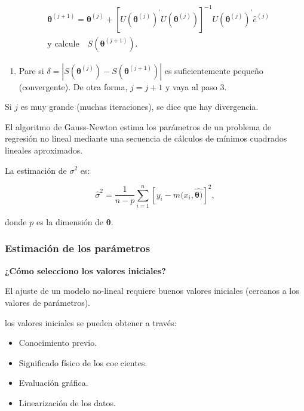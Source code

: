 \documentclass[
]{article}
\providecommand{\tightlist}{%
  \setlength{\itemsep}{0pt}\setlength{\parskip}{0pt}}
\begin{document}
\begin{equation}
\begin{split}
& \boldsymbol \theta^{(j+1)}=\boldsymbol \theta^{(j)}+[U(\boldsymbol \theta^{(j)})^{'}U(\boldsymbol \theta^{(j)})]^{-1}U(\boldsymbol \theta^{(j)})^{'} \hat{e}^{(j)} \\
& \text{y calcule} \quad S(\boldsymbol \theta^{(j+1)}).
\end{split}
\end{equation}

\begin{enumerate}
\def\labelenumi{\arabic{enumi}.}
\setcounter{enumi}{3}
\tightlist
\item
  Pare si \(\delta=|S(\boldsymbol \theta^{(j)})-S(\boldsymbol \theta^{(j+1)})|\) es suficientemente pequeño (convergente). De otra forma, \(j=j+1\) y vaya al paso 3.
\end{enumerate}

Si \(j\) es muy grande (muchas iteraciones), se dice que hay divergencia.

El algoritmo de Gauss-Newton estima los parámetros de un problema
de regresión no lineal mediante una secuencia de cálculos de mínimos cuadrados lineales aproximados.

La estimación de \(\sigma^2\) es:

\[
\hat{\sigma}^2=\frac{1}{n-p}\sum_{i=1}^n[y_{i}-m(x_{i},\hat{\boldsymbol \theta)}]^2,
\]

donde \(p\) es la dimensión de \(\boldsymbol \theta\).

\hypertarget{estimaciuxf3n-de-los-paruxe1metros-1}{%
\subsubsection{Estimación de los parámetros}\label{estimaciuxf3n-de-los-paruxe1metros-1}}

\textbf{¿Cómo selecciono los valores iniciales?}

El ajuste de un modelo no-lineal requiere buenos valores iniciales
(cercanos a los valores de parámetros).

los valores iniciales se pueden obtener a través:

\begin{itemize}
\item
  Conocimiento previo.
\item
  Significado físico de los coecientes.
\item
  Evaluación gráfica.
\item
  Linearización de los datos.
\end{itemize}
\end{document}

